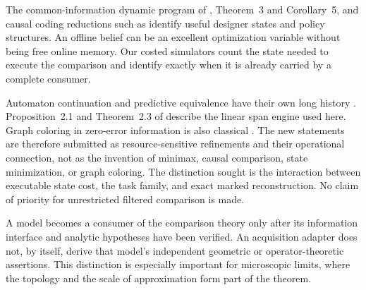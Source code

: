 The common-information dynamic program of
\cite{NayyarMahajanTeneketzis2013}, Theorem~3 and Corollary~5, and causal
coding reductions such as \cite{YukselCausal2010} identify useful designer
states and policy structures. An offline belief can be an excellent
optimization variable without being free online memory. Our costed
simulators count the state needed to execute the comparison and identify
exactly when it is already carried by a complete consumer.

Automaton continuation and predictive equivalence have their own long
history \cite{Nerode1958,ShaliziCrutchfield2001,Tzeng1992,Kiefer2020}.
Proposition~2.1 and Theorem~2.3 of \cite{Kiefer2020} describe the linear
span engine used here. Graph coloring in zero-error information is also
classical \cite{Witsenhausen1976}. The new statements are therefore
submitted as resource-sensitive refinements and their operational
connection, not as the invention of minimax, causal comparison, state
minimization, or graph coloring. The distinction sought is the interaction between executable state cost,
the task family, and exact marked reconstruction. No claim of priority
for unrestricted filtered comparison is made.

A model becomes a consumer of the comparison theory only after its
information interface and analytic hypotheses have been verified. An
acquisition adapter does not, by itself, derive that model's independent
geometric or operator-theoretic assertions. This distinction is especially
important for microscopic limits, where the topology and the scale of
approximation form part of the theorem.
